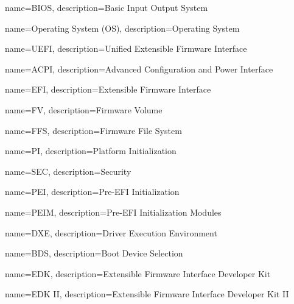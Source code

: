  {
    name=BIOS,
    description={Basic Input Output System
    }
}

 {
    name=Operating System (OS),
    description={Operating System
    }
}

 {
    name=UEFI,
    description={Unified Extensible Firmware Interface
    }
}

 {
    name=ACPI,
    description={Advanced Configuration and Power Interface
    }
}

 {
    name=EFI,
    description={Extensible Firmware Interface
    }
}


 {
    name=FV,
    description={Firmware Volume
    }
}

 {
    name=FFS,
    description={Firmware File System
    }
}

 {
    name=PI,
    description={Platform Initialization
    }
}

 {
    name=SEC,
    description={Security
    }
}

 {
    name=PEI,
    description={Pre-EFI Initialization
    }
}

 {
    name=PEIM,
    description={Pre-EFI Initialization Modules
    }
}

 {
    name=DXE,
    description={Driver Execution Environment
    }
}


 {
    name=BDS,
    description={Boot Device Selection
    }
}

 {
    name=EDK,
    description={Extensible Firmware Interface Developer Kit
    }
}

 {
    name=EDK II,
    description={Extensible Firmware Interface Developer Kit II
    }
}

